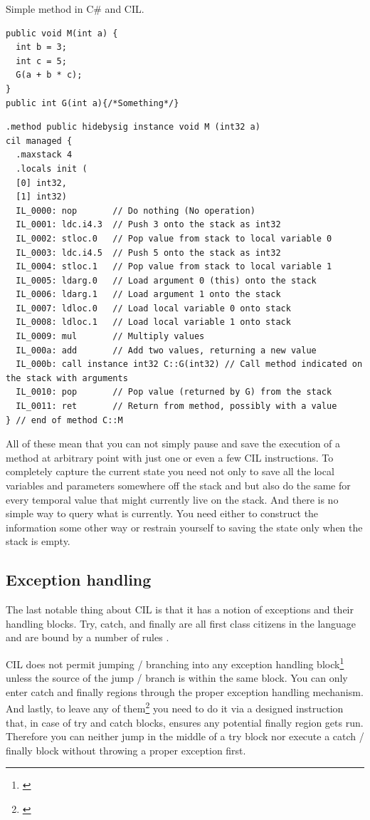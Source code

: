 \begin{listing}[h]
	\caption{Simple method in C\# and CIL.}
	\label{list2.1}
\begin{verbatim}
public void M(int a) {
  int b = 3;
  int c = 5;    
  G(a + b * c);
}
public int G(int a){/*Something*/}
\end{verbatim}
\begin{verbatim}
.method public hidebysig instance void M (int32 a) 
cil managed {
  .maxstack 4
  .locals init (
  [0] int32,
  [1] int32)
  IL_0000: nop       // Do nothing (No operation)
  IL_0001: ldc.i4.3  // Push 3 onto the stack as int32
  IL_0002: stloc.0   // Pop value from stack to local variable 0
  IL_0003: ldc.i4.5  // Push 5 onto the stack as int32
  IL_0004: stloc.1   // Pop value from stack to local variable 1
  IL_0005: ldarg.0   // Load argument 0 (this) onto the stack
  IL_0006: ldarg.1   // Load argument 1 onto the stack
  IL_0007: ldloc.0   // Load local variable 0 onto stack
  IL_0008: ldloc.1   // Load local variable 1 onto stack
  IL_0009: mul       // Multiply values
  IL_000a: add       // Add two values, returning a new value
  IL_000b: call instance int32 C::G(int32) // Call method indicated on the stack with arguments
  IL_0010: pop       // Pop value (returned by G) from the stack
  IL_0011: ret       // Return from method, possibly with a value
} // end of method C::M
\end{verbatim}
\end{listing}

All of these mean that you can not simply pause and save the execution of a method at arbitrary point with just one or even a few CIL instructions. To completely capture the current state you need not only to save all the local variables and parameters somewhere off the stack and but also do the same for every temporal value that might currently live on the stack. And there is no simple way to query what is currently. You need either to construct the information some other way or restrain yourself to saving the state only when the stack is empty.

\subsection{Exception handling}

The last notable thing about CIL is that it has a notion of exceptions and their handling blocks. Try, catch, and finally are all first class citizens in the language and are bound by a number of rules \citep[Sec. I.12.4]{CLIEcma}.

CIL does not permit jumping / branching into any exception handling block\footnote{\citep[Sec. I.12.4.2.8.2.7]{CLIEcma}} unless the source of the jump / branch is within the same block. You can only enter catch and finally regions through the proper exception handling mechanism. And lastly, to leave any of them\footnote{\citep[Sec. I.12.4.2.8.2.8]{CLIEcma}} you need to do it via a designed instruction that, in case of try and catch blocks, ensures any potential finally region gets run. Therefore you can neither jump in the middle of a try block nor execute a catch / finally block without throwing a proper exception first.

